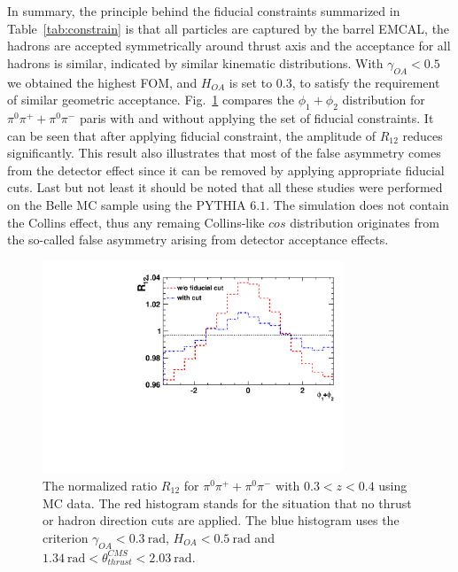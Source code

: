 In summary, the principle behind the fiducial constraints summarized in Table~\ref{tab:constrain} is that all particles are captured by the barrel EMCAL, the hadrons are accepted symmetrically around thrust axis and the acceptance for all hadrons is similar,  indicated by similar kinematic distributions. With $\gamma_{OA}<0.5$ we obtained the highest FOM, and $H_{OA}$ is set to 0.3, to satisfy the requirement of similar geometric acceptance. Fig.~\ref{fig:differentthetarange} compares the $\phi_1+\phi_2$ distribution for $\pi^0\pi^++\pi^0\pi^-$ paris with and without applying the set of fiducial constraints. It can be seen that after applying fiducial constraint, the amplitude of $R_{12}$ reduces significantly. This result also illustrates that  most of the false asymmetry comes from the detector effect since it can be removed by applying appropriate fiducial cuts. Last but not least it should be noted that all these studies were performed on the Belle MC sample using the PYTHIA $6.1$. The simulation does not contain the Collins effect, thus any remaing Collins-like $cos$ distribution originates from  the so-called false asymmetry arising from detector acceptance effects. 
\begin{figure}[h]
    \centering
    \includegraphics[width=0.8\textwidth,natwidth=610,natheight=642]{figure_dataselection/DetectorEffect.pdf}
    \caption{The normalized ratio $R_{12}$ for $\pi^0\pi^++\pi^0\pi^-$ with $0.3<z<0.4$ using MC data. The red histogram stands for the situation that no thrust or hadron direction cuts are applied. The blue histogram uses the criterion $\gamma_{OA} <0.3~\text{rad}$, $H_{OA}<0.5~\text{rad}$ and $1.34~\text{rad}<\theta^{CMS}_{thrust}<2.03~\text{rad}$.}
    \label{fig:differentthetarange}
\end{figure}

